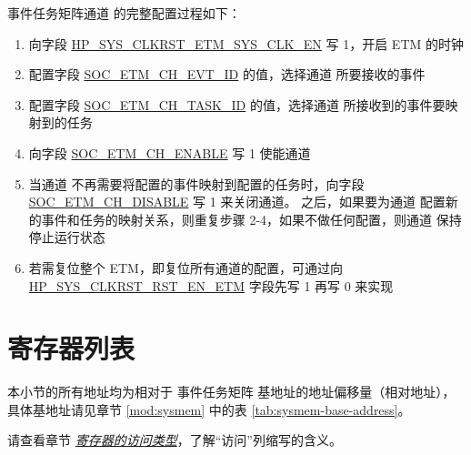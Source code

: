 \documentclass[main\_\_CN.tex]{subfiles}
\begin{document}
事件任务矩阵通道 的完整配置过程如下：
\begin{enumerate}
    \item 向字段 \hyperref[fielddesc:HPSYSCLKRSTETMSYSCLKEN]{HP\_SYS\_CLKRST\_ETM\_SYS\_CLK\_EN} 写 1，开启 ETM 的时钟
    \item 配置字段 \hyperref[fielddesc:SOCETMCH0EVTID]{SOC\_ETM\_CH\_EVT\_ID} 的值，选择通道 所要接收的事件
    \item 配置字段 \hyperref[fielddesc:SOCETMCH0TASKID]{SOC\_ETM\_CH\_TASK\_ID} 的值，选择通道 所接收到的事件要映射到的任务
    \item 向字段 \hyperref[fielddesc:SOCETMCHENABLE0]{SOC\_ETM\_CH\_ENABLE} 写 1 使能通道
    \item 当通道 不再需要将配置的事件映射到配置的任务时，向字段 \hyperref[fielddesc:SOCETMCHDISABLE0]{SOC\_ETM\_CH\_DISABLE} 写 1 来关闭通道。 之后，如果要为通道 配置新的事件和任务的映射关系，则重复步骤 2-4，如果不做任何配置，则通道 保持停止运行状态
    \item 若需复位整个 ETM，即复位所有通道的配置，可通过向 \hyperref[fielddesc:HPSYSCLKRSTRSTENETM]{HP\_SYS\_CLKRST\_RST\_EN\_ETM} 字段先写 1 再写 0 来实现
\end{enumerate}





\newpage
\hypertarget{evntaskmatrix-reg-summ}{}
\section{寄存器列表}
\label{sec:evntaskmatrix-reg-summ}

本小节的所有地址均为相对于 事件任务矩阵 基地址的地址偏移量（相对地址），具体基地址请见章节 \ref{mod:sysmem} \textit{} 中的表 \ref{tab:sysmem-base-address}。

请查看章节 \hyperref[glossary-access-types]{\textit{寄存器的访问类型}}，了解“访问”列缩写的含义。




\end{document}
